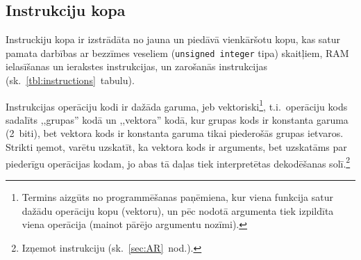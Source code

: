 \subsection{Instrukciju kopa} \label{sec:instrSet}

Instruckiju kopa ir izstrādāta no jauna un piedāvā vienkāršotu kopu, kas
satur pamata darbības ar bezzīmes veseliem (\texttt{unsigned integer} tipa)
skaitļiem, RAM ielasīšanas un ierakstes instrukcijas, un zarošanās
instrukcijas (sk.~\ref{tbl:instructions}~tabulu).

Instrukcijas operāciju kodi ir dažāda garuma, jeb vektoriski\footnote{%
	Termins aizgūts no programmēšanas paņēmiena, kur viena funkcija
	satur dažādu operāciju kopu (vektoru), un pēc nodotā argumenta tiek
	izpildīta viena operācija (mainot pārējo argumentu nozīmi).},
t.i.~operāciju kods sadalīts ,,grupas'' kodā un ,,vektora'' kodā, kur
grupas kods ir konstanta garuma (2~biti), bet vektora kods ir konstanta
garuma tikai piederošās grupas ietvaros. Strikti ņemot, varētu uzskatīt, ka
vektora kods ir arguments, bet uzskatāms par piederīgu operācijas
kodam, jo abas tā daļas tiek interpretētas dekodēšanas solī.\footnote{%
	Izņemot  instrukciju (sk.~\ref{sec:AR}~nod.).}

